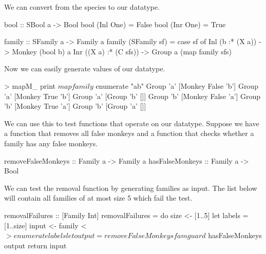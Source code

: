 \documentclass{beamer}
\begin{document}
\begin{frame}[fragile]
  We can convert from the species to our datatype.
  \begin{code}
bool :: SBool a -> Bool
bool (Inl One) = False
bool (Inr One) = True

family :: SFamily a -> Family a
family (SFamily sf) = case sf of
  Inl (b :* (X a)) -> Monkey (bool b) a
  Inr ((X a) :* (C sfs)) -> Group a (map family sfs)
  \end{code}
  \vfill
  Now we can easily generate values of our datatype.
  \begin{code}
> mapM_ print $ map family $ enumerate "ab"
Group 'a' [Monkey False 'b']
Group 'a' [Monkey True 'b']
Group 'a' [Group 'b' []]
Group 'b' [Monkey False 'a']
Group 'b' [Monkey True 'a']
Group 'b' [Group 'a' []]
  \end{code}
\end{frame}
\begin{frame}[fragile]
  We can use this to test functions that operate on our datatype. Suppose we have a function that
  removes all false monkeys and a function that checks whether a family has any false monkeys.
  \begin{code}
removeFalseMonkeys :: Family a -> Family a
hasFalseMonkeys :: Family a -> Bool
  \end{code}
  \vfill
  We can test the removal function by generating families as input.
  The list below will contain all families of at most size 5 which fail the test.
  \begin{code}
removalFailures :: [Family Int]
removalFailures = do
  size <- [1..5]
  let labels = [1..size]
  input <- family <$> enumerate labels
  let output = removeFalseMonkeys fam
  guard $ hasFalseMonkeys output
  return input
  \end{code}
\end{frame}
\end{document}
